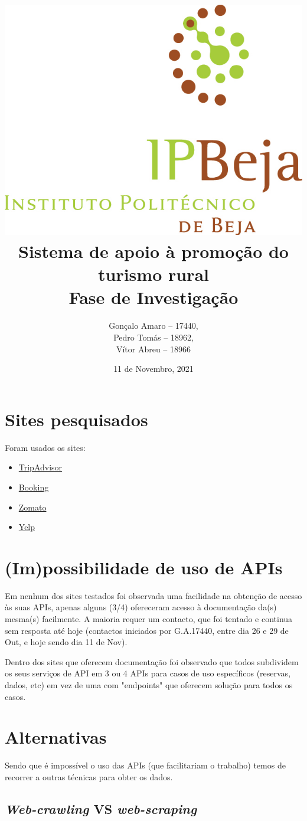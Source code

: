 \documentclass[a4paper,10pt]{article}
\title{\includegraphics[scale=0.5]{ipbeja_logo.png}\\[0.5cm]Sistema de apoio à promoção do turismo rural\\Fase de Investigação} %
\author{Gonçalo Amaro -- 17440,\\ Pedro Tomás -- 18962,\\ Vítor Abreu -- 18966} %
\date{11 de Novembro, 2021} %
\begin{document}
\maketitle

\newpage

{
  \hypersetup{linkcolor=black}
  \tableofcontents
}

\newpage

\section{Sites pesquisados}

Foram usados os sites:
\begin{itemize}
    \item \href{https://www.tripadvisor.com/}{TripAdvisor}
    \item \href{https://www.booking.com/}{Booking}
    \item \href{https://www.zomato.com/}{Zomato}
    \item \href{https://www.yelp.com/}{Yelp}
\end{itemize}

\section{(Im)possibilidade de uso de APIs}

Em nenhum dos sites testados foi observada uma facilidade na obtenção de acesso às suas APIs, apenas alguns (3/4) ofereceram acesso à documentação da(s) mesma(s) facilmente. A maioria requer um contacto, que foi tentado e continua sem resposta até hoje (contactos iniciados por G.A.17440, entre dia 26 e 29 de Out, e hoje sendo dia 11 de Nov).

Dentro dos sites que oferecem documentação foi observado que todos subdividem os seus serviços de API em 3 ou 4 APIs para casos de uso específicos (reservas, dados, etc) em vez de uma com "endpoints" que oferecem solução para todos os casos.

\section{Alternativas}

Sendo que é impossível o uso das APIs (que facilitariam o trabalho) temos de recorrer a outras técnicas para obter os dados.

\subsection{\textit{Web-crawling} VS \textit{web-scraping}}
\end{document}
